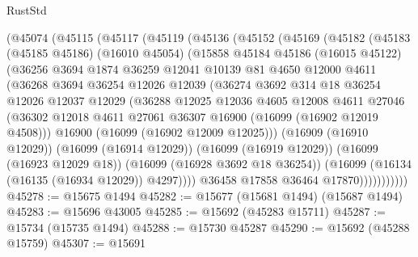 \begin{lexlean}{RustStd}
\begin{coremodule}
    (@45074
      (@45115
        (@45117
          (@45119
            (@45136
              (@45152
                (@45169
                  (@45182
                    (@45183
                      (@45185 @45186)
                      (@16010 @45054)
                      (@15858
                        @45184
                        @45186
                        (@16015 @45122)
                        (@36256
                          @3694
                          @1874
                          @36259
                          @12041
                          @10139
                          @81
                          @4650
                          @12000
                          @4611
                          (@36268
                            @3694
                            @36254
                            @12026
                            @12039
                            (@36274
                              @3692
                              @314
                              @18
                              @36254
                              @12026
                              @12037
                              @12029
                              (@36288
                                @12025
                                @12036
                                @4605
                                @12008
                                @4611
                                @27046
                                (@36302
                                  @12018
                                  @4611
                                  @27061
                                  @36307
                                  @16900
                                  (@16099 (@16902 @12019 @4508)))
                                @16900
                                (@16099 (@16902 @12009 @12025)))
                              (@16909 (@16910 @12029))
                              (@16099 (@16914 @12029))
                              (@16099 (@16919 @12029))
                              (@16099 (@16923 @12029 @18))
                              (@16099 (@16928 @3692 @18 @36254))
                              (@16099 (@16134 (@16135 (@16934 @12029)) @4297))))
                          @36458
                          @17858
                          @36464
                          @17870)))))))))))
@45278 := @15675 @1494
@45282 := @15677 (@15681 @1494) (@15687 @1494)
@45283 := @15696 @43005
@45285 := @15692 (@45283 @15711)
@45287 := @15734 (@15735 @1494)
@45288 := @15730 @45287
@45290 := @15692 (@45288 @15759)
@45307 := @15691

\end{coremodule}
\end{lexlean}
